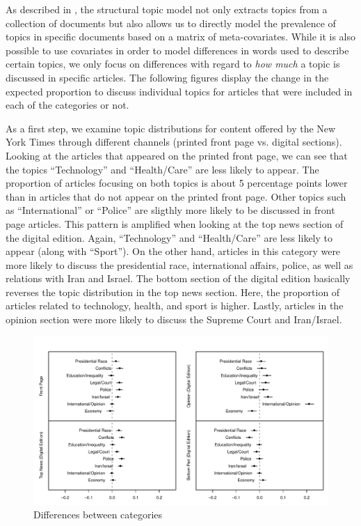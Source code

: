 \documentclass[12pt]{article}
\begin{document}
\begin{doublespace}
As described in \citet{roberts2014structural}, the structural topic model not only extracts topics from a collection of documents but also allows us to directly model the prevalence of topics in specific documents based on a matrix of meta-covariates. While it is also possible to use covariates in order to model differences in words used to describe certain topics, we only focus on differences with regard to \textit{how much} a topic is discussed in specific articles. The following figures display the change in the expected proportion to discuss individual topics for articles that were included in each of the categories or not.

As a first step, we examine topic distributions for content offered by the New York Times through different channels (printed front page vs. digital sections). Looking at the articles that appeared on the printed front page, we can see that the topics ``Technology'' and ``Health/Care'' are less likely to appear. The proportion of articles focusing on both topics is about 5 percentage points lower than in articles that do not appear on the printed front page. Other topics such as ``International'' or ``Police'' are sligthly more likely to be discussed in front page articles. This pattern is amplified when looking at the top news section of the digital edition. Again, ``Technology'' and ``Health/Care'' are less likely to appear (along with ``Sport''). On the other hand, articles in this category were more likely to discuss the presidential race, international affairs, police, as well as relations with Iran and Israel. The bottom section of the digital edition basically reverses the topic distribution in the top news section. Here, the proportion of articles related to technology, health, and sport is higher. Lastly, articles in the opinion section were more likely to discuss the Supreme Court and Iran/Israel.

\begin{figure}
\caption{Differences between categories}\label{fig:res_nyt_polecon}
\includegraphics[width=\textwidth]{../calc/fig/res_nyt_polecon}
\end{figure}


\end{doublespace}
\end{document}
